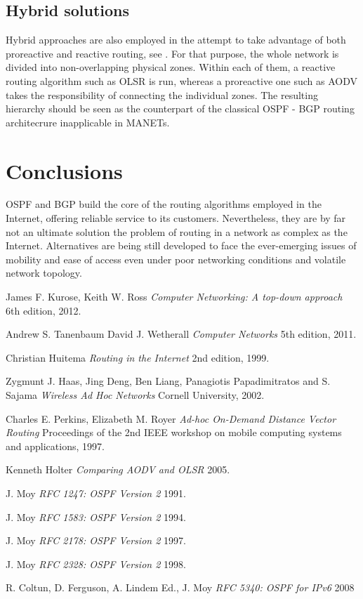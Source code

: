 \documentclass{acm_proc_article-sp}
\begin{document}
\subsection{Hybrid solutions}
Hybrid approaches are also employed in the attempt to take advantage of both proreactive and reactive routing, see \cite{haas}. For that purpose, the whole network is divided into non-overlapping physical zones. Within each of them, a reactive routing algorithm such as OLSR is run, whereas a proreactive one such as AODV takes the responsibility of connecting the individual zones. The resulting hierarchy should be seen as the counterpart of the classical OSPF - BGP routing architecrure inapplicable in MANETs.

\section{Conclusions}

OSPF and BGP build the core of the routing algorithms employed in the Internet, offering reliable service to its customers. Nevertheless, they are by far not an ultimate solution the problem of routing in a network as complex as the Internet. Alternatives are being still developed to face the ever-emerging issues of mobility and ease of access even under poor networking conditions and volatile network topology.

\begin{thebibliography}{1}

   James F. Kurose, Keith W. Ross {\em Computer Networking: A top-down approach}  6th edition, 2012.

    Andrew S. Tanenbaum David J. Wetherall {\em Computer Networks} 5th edition, 2011.

    Christian Huitema {\em Routing in the Internet} 2nd edition, 1999.
  
   Zygmunt J. Haas, Jing Deng, Ben Liang, Panagiotis Papadimitratos and S. Sajama {\em Wireless Ad Hoc Networks } Cornell University, 2002.

    Charles E. Perkins, Elizabeth M. Royer {\em Ad-hoc On-Demand Distance Vector Routing} Proceedings of the 2nd IEEE workshop on mobile computing systems and applications, 1997.
  
   Kenneth Holter {\em Comparing AODV and OLSR} 2005. 

   J. Moy {\em RFC 1247: OSPF Version 2} 1991.
  
   J. Moy {\em RFC 1583: OSPF Version 2} 1994.
  
   J. Moy {\em RFC 2178: OSPF Version 2} 1997.
  
   J. Moy {\em RFC 2328: OSPF Version 2} 1998.
  
   R. Coltun, D. Ferguson, A. Lindem Ed., J. Moy {\em RFC 5340: OSPF for IPv6} 2008
  
  \end{thebibliography}
\end{document}
